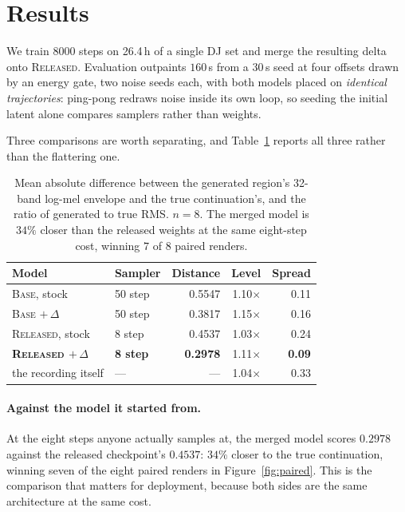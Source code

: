 \documentclass[10pt,twocolumn,letterpaper]{article}
\begin{document}
\section{Results}
\label{sec:final}

We train 8000 steps on 26.4\,h of a single DJ set and merge the resulting delta
onto \textsc{Released}. Evaluation outpaints $160$\,s from a $30$\,s seed at four
offsets drawn by an energy gate, two noise seeds each, with both models placed on
\emph{identical trajectories}: ping-pong redraws noise inside its own loop, so
seeding the initial latent alone compares samplers rather than weights.

Three comparisons are worth separating, and Table~\ref{tab:final} reports all
three rather than the flattering one.

\begin{table}[t]
\centering
\small
\begin{tabular}{llrrr}
\toprule
Model & Sampler & Distance & Level & Spread \\
\midrule
\textsc{Base}, stock              & 50 step & 0.5547 & 1.10$\times$ & 0.11 \\
\textsc{Base} $+\,\Delta$         & 50 step & 0.3817 & 1.15$\times$ & 0.16 \\
\textsc{Released}, stock          & 8 step  & 0.4537 & 1.03$\times$ & 0.24 \\
\textbf{\textsc{Released} $+\,\Delta$} & \textbf{8 step} & \textbf{0.2978} & 1.11$\times$ & \textbf{0.09} \\
\midrule
the recording itself              & ---     & ---    & 1.04$\times$ & 0.33 \\
\bottomrule
\end{tabular}
\caption{Mean absolute difference between the generated region's 32-band log-mel
envelope and the true continuation's, and the ratio of generated to true RMS.
$n=8$. The merged model is $34\%$ closer than the released weights at the same
eight-step cost, winning $7$ of $8$ paired renders.}
\label{tab:final}
\end{table}

\paragraph{Against the model it started from.} At the eight steps anyone actually
samples at, the merged model scores $0.2978$ against the released checkpoint's
$0.4537$: $34\%$ closer to the true continuation, winning seven of the eight
paired renders in Figure~\ref{fig:paired}. This is the comparison that matters
for deployment, because both sides are the same architecture at the same cost.
\end{document}
